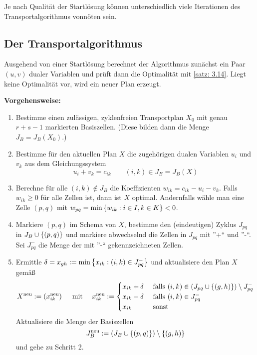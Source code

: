 Je nach Qualität der Startlösung können unterschiedlich viele Iterationen des Transportalgorithmus vonnöten sein.

\subsection{Der Transportalgorithmus}

Ausgehend von einer Startlösung berechnet der Algorithmus zunächst ein Paar $(u,v)$ dualer Variablen und prüft dann die Optimalität mit \cref{satz: 3.14}. Liegt keine Optimalität vor, wird ein neuer Plan erzeugt.

\textbf{Vorgehensweise:}

\begin{enumerate}
	\item Bestimme einen zulässigen, zyklenfreien Transportplan $X_0$ mit genau $r+s-1$ markierten Basiszellen. (Diese bilden dann die Menge $J_B = J_B(X_0)$.)
	\item Bestimme für den aktuellen Plan $X$ die zugehörigen dualen Variablen $u_i$ und $v_k$ aus dem Gleichungssystem 
	\begin{equation}
		u_i + v_k = c_{ik} \qquad (i,k) \in J_B = J_B(X)
		\label{eq: 3.18}
	\end{equation}
	\item Berechne für alle $(i,k) \notin J_B$ die Koeffizienten $w_{ik} = c_{ik} - u_i - v_k$. Falls $w_{ik} \ge 0$ für alle Zellen ist, dann ist $X$ optimal. Andernfalls wähle man eine Zelle $(p,q)$ mit $w_{pq} = \min\left\{ w_{ik} : i \in I, k \in K \right\} < 0$.
	\item Markiere $(p,q)$ im Schema von $X$, bestimme den  (eindeutigen) Zyklus $J_{pq}$ in $J_B \cup \left\{ (p,q) \right\}$ und markiere abwechselnd die Zellen in $J_{pq}$ mit ''+`` und ''-``. Sei $J_{pq}^-$ die Menge der mit ''-`` gekennzeichneten Zellen.
	\item Ermittle $\delta = x_{gh} \mathrel{:=} \min\left\{ x_{ik} : (i,k) \in J_{pq}^- \right\}$ und aktualisiere den Plan $X$ gemäß
	\begin{equation*}
		X^{\text{neu}} \mathrel{:=} \left( x_{ik}^{\text{neu}} \right) \quad \text{ mit } \quad  
		x_{ik}^{\text{neu}} \mathrel{:=} \begin{cases}
		x_{ik} + \delta & \text{ falls }(i,k) \in \left( J_{pq} \cup \left\{ (g,h) \right\} \right) \setminus J_{pq}^-\\
		x_{ik} - \delta & \text{ falls }(i,k) \in J_{pq}^-\\
		x_{ik} & \text{ sonst}
		\end{cases}
	\end{equation*}
	Aktualisiere die Menge der Basiszellen
	\begin{equation*}
		J_B^{\text{neu}} \mathrel{:=} \left( J_B \cup \left\{ (p,q) \right\} \right) \setminus \left\{ (g,h) \right\}
	\end{equation*}
	und gehe zu Schritt 2.
\end{enumerate}

